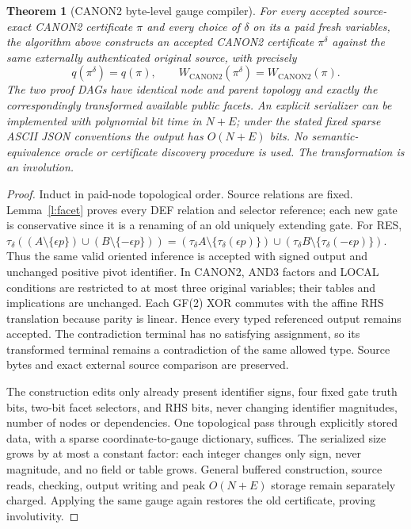 \documentclass[11pt]{article}
\newtheorem{theorem}{Theorem}
\begin{document}
\begin{theorem}[CANON2 byte-level gauge compiler]\label{t:compiler}
For every accepted source-exact CANON2 certificate \(\pi\) and every
choice of \(\delta\) on its \(a\) paid fresh variables, the algorithm above
constructs an accepted CANON2 certificate \(\pi^\delta\) against the
\emph{same externally authenticated original source}, with precisely
\[
 \boxed{q(\pi^\delta)=q(\pi),\qquad
 W_{\mathrm{CANON2}}(\pi^\delta)=W_{\mathrm{CANON2}}(\pi).}
\]
The two proof DAGs have identical node and parent topology and exactly
the correspondingly transformed available public facets. An explicit
serializer can be implemented with polynomial bit time in \(N+E\);
under the stated fixed sparse ASCII JSON conventions the output has
\(O(N+E)\) bits. No semantic-equivalence oracle or certificate discovery
procedure is used. The transformation is an involution.
\end{theorem}
\begin{proof}
Induct in paid-node topological order.
Source relations are fixed. Lemma~\ref{l:facet} proves every DEF relation
and selector reference; each new gate is conservative since it is a
renaming of an old uniquely extending gate. For RES,
\(\tau_\delta((A\setminus\{\epsilon p\})\cup
(B\setminus\{-\epsilon p\}))
=(\tau_\delta A\setminus\{\tau_\delta(\epsilon p)\})
\cup(\tau_\delta B\setminus\{\tau_\delta(-\epsilon p)\})\).
Thus the same valid oriented inference is accepted with signed
output and unchanged positive pivot identifier. In CANON2,
AND3 factors and LOCAL conditions are restricted to at most three
original variables; their tables and implications are unchanged.
Each GF(2) XOR commutes with the affine RHS translation because parity
is linear. Hence every typed referenced output remains accepted.
The contradiction terminal has no satisfying assignment, so its
transformed terminal remains a contradiction of the same allowed type.
Source bytes and exact external source comparison are preserved.

The construction edits only already present identifier signs, four
fixed gate truth bits, two-bit facet selectors, and RHS bits, never
changing identifier magnitudes, number of nodes or dependencies.
One topological pass through explicitly stored data, with a sparse
coordinate-to-gauge dictionary, suffices. The serialized size grows by
at most a constant factor: each integer changes only sign, never
magnitude, and no field or table grows. General buffered construction,
source reads, checking, output writing and peak \(O(N+E)\) storage remain
separately charged. Applying the same gauge again restores the old
certificate, proving involutivity.
\end{proof}
\end{document}
